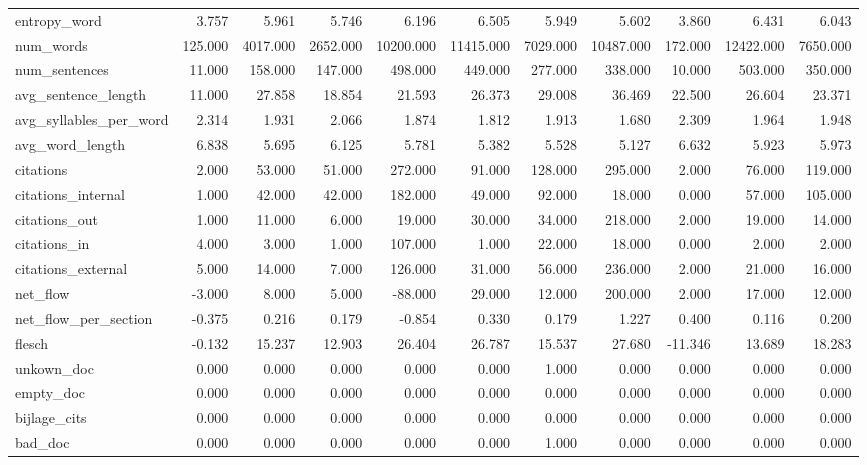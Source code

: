 \begin{tabular}{lrrrrrrrrrr}
\cline{1-11}
entropy\_word & 3.757 & 5.961 & 5.746 & 6.196 & 6.505 & 5.949 & 5.602 & 3.860 & 6.431 & 6.043 \\
\cline{1-11}
num\_words & 125.000 & 4017.000 & 2652.000 & 10200.000 & 11415.000 & 7029.000 & 10487.000 & 172.000 & 12422.000 & 7650.000 \\
\cline{1-11}
num\_sentences & 11.000 & 158.000 & 147.000 & 498.000 & 449.000 & 277.000 & 338.000 & 10.000 & 503.000 & 350.000 \\
\cline{1-11}
avg\_sentence\_length & 11.000 & 27.858 & 18.854 & 21.593 & 26.373 & 29.008 & 36.469 & 22.500 & 26.604 & 23.371 \\
\cline{1-11}
avg\_syllables\_per\_word & 2.314 & 1.931 & 2.066 & 1.874 & 1.812 & 1.913 & 1.680 & 2.309 & 1.964 & 1.948 \\
\cline{1-11}
avg\_word\_length & 6.838 & 5.695 & 6.125 & 5.781 & 5.382 & 5.528 & 5.127 & 6.632 & 5.923 & 5.973 \\
\cline{1-11}
citations & 2.000 & 53.000 & 51.000 & 272.000 & 91.000 & 128.000 & 295.000 & 2.000 & 76.000 & 119.000 \\
\cline{1-11}
citations\_internal & 1.000 & 42.000 & 42.000 & 182.000 & 49.000 & 92.000 & 18.000 & 0.000 & 57.000 & 105.000 \\
\cline{1-11}
citations\_out & 1.000 & 11.000 & 6.000 & 19.000 & 30.000 & 34.000 & 218.000 & 2.000 & 19.000 & 14.000 \\
\cline{1-11}
citations\_in & 4.000 & 3.000 & 1.000 & 107.000 & 1.000 & 22.000 & 18.000 & 0.000 & 2.000 & 2.000 \\
\cline{1-11}
citations\_external & 5.000 & 14.000 & 7.000 & 126.000 & 31.000 & 56.000 & 236.000 & 2.000 & 21.000 & 16.000 \\
\cline{1-11}
net\_flow & -3.000 & 8.000 & 5.000 & -88.000 & 29.000 & 12.000 & 200.000 & 2.000 & 17.000 & 12.000 \\
\cline{1-11}
net\_flow\_per\_section & -0.375 & 0.216 & 0.179 & -0.854 & 0.330 & 0.179 & 1.227 & 0.400 & 0.116 & 0.200 \\
\cline{1-11}
flesch & -0.132 & 15.237 & 12.903 & 26.404 & 26.787 & 15.537 & 27.680 & -11.346 & 13.689 & 18.283 \\
\cline{1-11}
unkown\_doc & 0.000 & 0.000 & 0.000 & 0.000 & 0.000 & 1.000 & 0.000 & 0.000 & 0.000 & 0.000 \\
\cline{1-11}
empty\_doc & 0.000 & 0.000 & 0.000 & 0.000 & 0.000 & 0.000 & 0.000 & 0.000 & 0.000 & 0.000 \\
\cline{1-11}
bijlage\_cits & 0.000 & 0.000 & 0.000 & 0.000 & 0.000 & 0.000 & 0.000 & 0.000 & 0.000 & 0.000 \\
\cline{1-11}
bad\_doc & 0.000 & 0.000 & 0.000 & 0.000 & 0.000 & 1.000 & 0.000 & 0.000 & 0.000 & 0.000 \\
\cline{1-11}
\bottomrule
\end{tabular}
